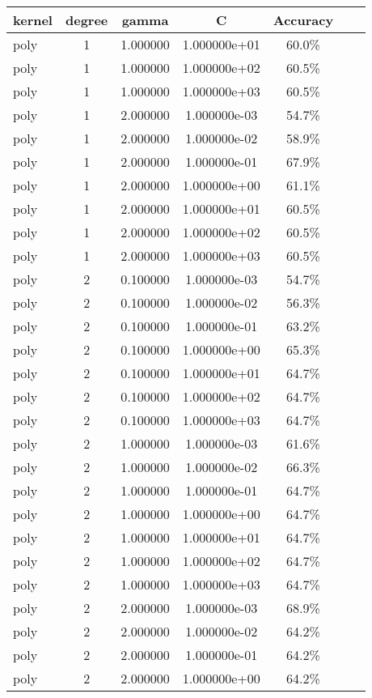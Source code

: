 \documentclass[11pt,spanish,listoffigures,listoftables]{tfgetsinf}
\begin{document}
\begin{table}
 \begin{tabular}{l*{5}{c}r}
 kernel & degree & gamma & C & Accuracy\\
 \hline
 poly & 1 & 1.000000 & 1.000000e+01 & 60.0\%\\
 poly & 1 & 1.000000 & 1.000000e+02 & 60.5\%\\
 poly & 1 & 1.000000 & 1.000000e+03 & 60.5\%\\
 poly & 1 & 2.000000 & 1.000000e-03 & 54.7\%\\
 poly & 1 & 2.000000 & 1.000000e-02 & 58.9\%\\
 poly & 1 & 2.000000 & 1.000000e-01 & 67.9\%\\
 poly & 1 & 2.000000 & 1.000000e+00 & 61.1\%\\
 poly & 1 & 2.000000 & 1.000000e+01 & 60.5\%\\
 poly & 1 & 2.000000 & 1.000000e+02 & 60.5\%\\
 poly & 1 & 2.000000 & 1.000000e+03 & 60.5\%\\
 poly & 2 & 0.100000 & 1.000000e-03 & 54.7\%\\
 poly & 2 & 0.100000 & 1.000000e-02 & 56.3\%\\
 poly & 2 & 0.100000 & 1.000000e-01 & 63.2\%\\
 poly & 2 & 0.100000 & 1.000000e+00 & 65.3\%\\
 poly & 2 & 0.100000 & 1.000000e+01 & 64.7\%\\
 poly & 2 & 0.100000 & 1.000000e+02 & 64.7\%\\
 poly & 2 & 0.100000 & 1.000000e+03 & 64.7\%\\
 poly & 2 & 1.000000 & 1.000000e-03 & 61.6\%\\
 poly & 2 & 1.000000 & 1.000000e-02 & 66.3\%\\
 poly & 2 & 1.000000 & 1.000000e-01 & 64.7\%\\
 poly & 2 & 1.000000 & 1.000000e+00 & 64.7\%\\
 poly & 2 & 1.000000 & 1.000000e+01 & 64.7\%\\
 poly & 2 & 1.000000 & 1.000000e+02 & 64.7\%\\
 poly & 2 & 1.000000 & 1.000000e+03 & 64.7\%\\
 poly & 2 & 2.000000 & 1.000000e-03 & 68.9\%\\
 poly & 2 & 2.000000 & 1.000000e-02 & 64.2\%\\
 poly & 2 & 2.000000 & 1.000000e-01 & 64.2\%\\
 poly & 2 & 2.000000 & 1.000000e+00 & 64.2\%\\

\end{tabular}
\end{table}
\end{document}
